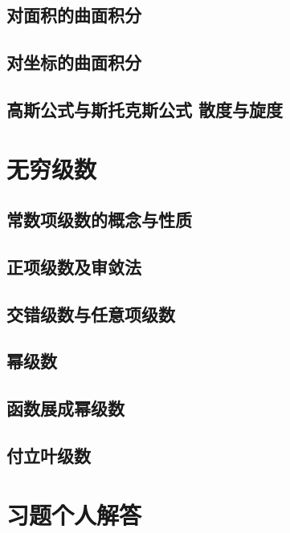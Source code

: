 \documentclass[lang=cn,10pt]{elegantbook}
\begin{document}
\section{对面积的曲面积分}
\section{对坐标的曲面积分}
\section{高斯公式与斯托克斯公式 散度与旋度}




\chapter{无穷级数}
\section{常数项级数的概念与性质}
\section{正项级数及审敛法}
\section{交错级数与任意项级数}
\section{幂级数}
\section{函数展成幂级数}
\section{付立叶级数}





\chapter*{习题个人解答}
\nocite{*}
\end{document}
